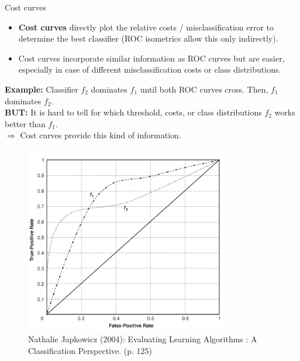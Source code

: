\documentclass[11pt,compress,t,notes=noshow, xcolor=table]{beamer}
\begin{document}
\begin{vbframe}{Cost curves}

\begin{itemize}
  \item \textbf{Cost curves} directly plot the relative costs / 
  misclassification error to determine the best classifier (ROC isometrics allow 
  this only indirectly).
  \item Cost curves incorporate similar information as ROC curves but are 
  easier, especially in case of different misclassification costs or class 
  distributions. %
\end{itemize}

\vspace{-0.1cm}

\begin{minipage}{0.5\textwidth}
  \small
  \raggedright
  \textbf{Example:} Classifier $f_2$ dominates $f_1$ until both ROC curves 
  cross. Then, $f_1$ dominates $f_2$. \\
  \textbf{BUT:} It is hard to tell for which threshold, costs, or class 
  distributions $f_2$ works better than $f_1$. \\
  $\Rightarrow$ Cost curves provide this kind of information.
\end{minipage}
\begin{minipage}{0.49\textwidth}
  \begin{figure}
    \centering
    \includegraphics[width=0.8\textwidth]{figure_man/cost-curves-1.png}
    \tiny
    \\Nathalie Japkowicz (2004): Evaluating Learning Algorithms : A 
    Classification Perspective. (p. 125)
  \end{figure}
\end{minipage}


\end{vbframe}
\end{document}
